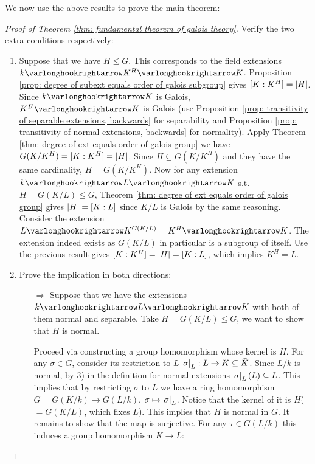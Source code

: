 \documentclass{article}
\begin{document}
\textstart
We now use the above results to prove the main theorem:
\begin{proof}[Proof of Theorem \ref{thm: fundamental theorem of galois theory}]
    Verify the two extra conditions respectively:
    \begin{enumerate}[label=\arabic*)]
        \item Suppose that we have $H \leq G$. This corresponds to the field extensions $k \ext K^H \ext K$. Proposition \ref{prop: degree of subext equals order of galois subgroup} gives $[K : K^H] = \left|H\right|$. Since $k \ext K$ is Galois, $K^H \ext K$ is Galois (use Proposition \ref{prop: transitivity of separable extensions, backwards} for separability and Proposition \ref{prop: transitivity of normal extensions, backwards} for normality). Apply Theorem \ref{thm: degree of ext equals order of galois group} we have $G(K/K^H) = [K : K^H] = \left|H\right|$. Since $H \subseteq G(K/K^H)$ and they have the same cardinality, $H = G(K/K^H)$. Now for any extension $k \ext L \ext K$ s.t. $H = G(K/L) \leq G$, Theorem \ref{thm: degree of ext equals order of galois group} gives $\left|H\right| = [K : L]$ since $K/L$ is Galois by the same reasoning. Consider the extension $L \ext K^{G(K/L)} = K^H \ext K$. The extension indeed exists as $G(K/L)$ in particular is a subgroup of itself. Use the previous result gives $[K : K^H] = \left|H\right| = [K : L]$, which implies $K^H = L$.
        \item Prove the implication in both directions:
        \begin{itemize}
            \item[$\Rightarrow$] Suppose that we have the extensions $k \ext L \ext K$ with both of them normal and separable. Take $H = G(K/L) \leq G$, we want to show that $H$ is normal. 
            
            Proceed via constructing a group homomorphism whose kernel is $H$. For any $\sigma \in G$, consider its restriction to $L$ $\left.\sigma\right|_{L}: L \to K \subseteq \bar{K}$. Since $L/k$ is normal, by \hyperref[def: normal extension]{3) in the definition for normal extensions} $\left.\sigma\right|_{L}(L) \subseteq L$. This implies that by restricting $\sigma$ to $L$ we have a ring homomorphism $G = G(K/k) \to G(L/k)$, $\sigma \mapsto \left.\sigma\right|_{L}$. Notice that the kernel of it is $H$($=G(K/L)$, which fixes $L$). This implies that $H$ is normal in $G$. It remains to show that the map is surjective. For any $\tau \in G(L/k)$ this induces a group homomorphism $K \to \bar{L}$:


\end{itemize}
\end{enumerate}
\end{proof}
\end{document}
